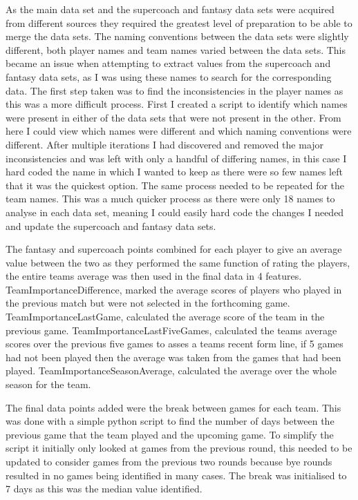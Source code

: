 \documentclass{imc-inf}
\begin{document}
	As the main data set and the supercoach and fantasy data sets were acquired from different sources they required the greatest level of preparation to be able to merge the data sets. The naming conventions between the data sets were slightly different, both player names and team names varied between the data sets. This became an issue when attempting to extract values from the supercoach and fantasy data sets, as I was using these names to search for the corresponding data. The first step taken was to find the inconsistencies in the player names as this was a more difficult process. First I created a script to identify which names were present in either of the data sets that were not present in the other. From here I could view which names were different and which naming conventions were different. After multiple iterations I had discovered and removed the major inconsistencies and was left with only a handful of differing names, in this case I hard coded the name in which I wanted to keep as there were so few names left that it was the quickest option. The same process needed to be repeated for the team names. This was a much quicker process as there were only 18 names to analyse in each data set, meaning I could easily hard code the changes I needed and update the supercoach and fantasy data sets.
	
	The fantasy and supercoach points combined for each player to give an average value between the two as they performed the same function of rating the players, the entire teams average was then used in the final data in 4 features. TeamImportanceDifference, marked the average scores of players who played in the previous match but were not selected in the forthcoming game. TeamImportanceLastGame, calculated the average score of the team in the previous game. TeamImportanceLastFiveGames, calculated the teams average scores over the previous five games to asses a teams recent form line, if 5 games had not been played then the average was taken from the games that had been played. TeamImportanceSeasonAverage, calculated the average over the whole season for the team.
	
	The final data points added were the break between games for each team. This was done with a simple python script to find the number of days between the previous game that the team played and the upcoming game. To simplify the script it initially only looked at games from the previous round, this needed to be updated to consider games from the previous two rounds because bye rounds resulted in no games being identified in many cases. The break was initialised to 7 days as this was the median value identified. 
	
\end{document}
